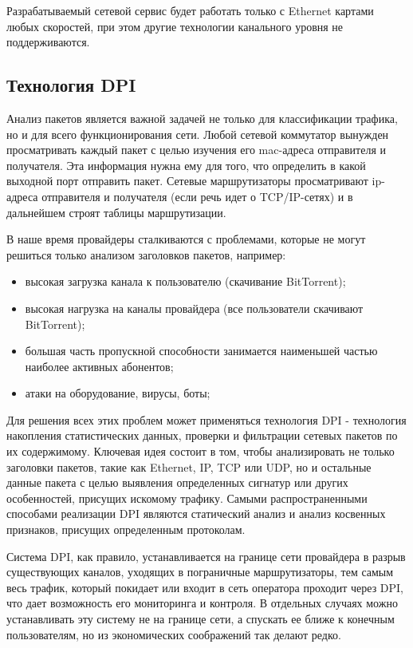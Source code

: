 Разрабатываемый сетевой сервис будет работать только с Ethernet картами любых скоростей, при этом другие технологии канального уровня не поддерживаются.

\subsection{Технология DPI}
Анализ пакетов является важной задачей не только для классификации трафика, но и для всего функционирования сети. Любой сетевой коммутатор вынужден просматривать каждый пакет с целью изучения его mac-адреса отправителя и получателя. Эта информация нужна ему для того, что определить в какой выходной порт отправить пакет. Сетевые маршрутизаторы просматривают ip-адреса отправителя и получателя (если речь идет о TCP/IP-сетях) и в дальнейшем строят таблицы маршрутизации.

В наше время провайдеры сталкиваются с проблемами, которые не могут решиться только анализом заголовков пакетов, например:
\begin{itemize}
\item высокая загрузка канала к пользователю (скачивание BitTorrent);
\item высокая нагрузка на каналы провайдера (все пользователи скачивают BitTorrent);
\item большая часть пропускной способности занимается наименьшей частью наиболее активных абонентов;
\item атаки на оборудование, вирусы, боты;
\end{itemize}

Для решения всех этих проблем может применяться технология DPI - технология накопления статистических данных, проверки и фильтрации сетевых пакетов по их содержимому. Ключевая идея состоит в том, чтобы анализировать не только заголовки пакетов, такие как Ethernet, IP, TCP или UDP, но и остальные данные пакета с целью выявления определенных сигнатур или других особенностей, присущих искомому трафику. Самыми распространенными способами реализации DPI являются статический анализ и анализ косвенных признаков, присущих определенным протоколам. 

Система DPI, как правило, устанавливается на границе сети провайдера в разрыв существующих каналов, уходящих в пограничные маршрутизаторы, тем самым весь трафик, который покидает или входит в сеть оператора проходит через DPI, что дает возможность его мониторинга и контроля. В отдельных случаях можно устанавливать эту систему не на границе сети, а спускать ее ближе к конечным пользователям, но из экономических соображений так делают редко.

